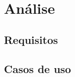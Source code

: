 %
%
\chapter[Análise]{
	Análise
	\label{ch.anl}
}

% 
%
\section[Requisitos]{
	Requisitos}

\section[Casos de uso]{
	Casos de uso}
